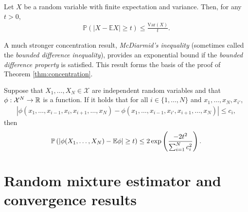 \medskip

\begin{lemma}\label{lemma:chebyshev}
Let $X$ be a random variable with finite expectation and variance. Then, for any $t>0$,
\begin{align*}
\mathbb{P}\left( |X - \mathbb{E}X | \geq t \right) \leq \frac{\mathrm{Var}(X)}{t}.
\end{align*}
\end{lemma}

A much stronger concentration result, \emph{McDiarmid's inequality} (sometimes called the \emph{bounded difference	inequality}), provides an exponential bound if the \emph{bounded difference property} is satisfied.
This result forms the basis of the proof of Theorem \ref{thm:concentration}.

\medskip

\begin{theorem}\label{thm:mcdiarmid}
Suppose that $X_1, \ldots, X_N \in \mathcal{X}$ are independent random variables and that $\phi : \mathcal{X}^N \to \mathbb{R}$ is a function. 
If it holds that for all $i\in\{1,\ldots,N\}$ and $x_1, \ldots, x_N, x_{i'}$, 
\begin{align*}
    \left| \phi(x_1, \ldots, x_{i-1}, x_i, x_{i+1}, \ldots, x_N) - \phi(x_1, \ldots, x_{i-1}, x_{i'}, x_{i+1}, \ldots, x_N)\right| \leq c_i,
\end{align*}
then
\begin{align*}
    \mathbb{P} \left(|\phi(X_1,\ldots, X_N) - \mathbb{E}\phi| \geq t \right) \leq 2\exp\left(\frac{-2t^2}{\sum_{i=1}^N c^2_i} \right).
\end{align*}
\end{theorem}




\section{Random mixture estimator and convergence results}\label{sec:theory}

